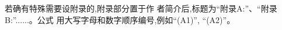 \documentclass[10.5pt,twocolumn]{aaas}
\begin{document}

\vskip 20pt


若确有特殊需要设附录的,附录部分置于作
者简介后,标题为“附录A:”、“附录B:”......。公式
用大写字母和数字顺序编号,例如“(A1)”, “(A2)”。





\newpage
\end{document}

